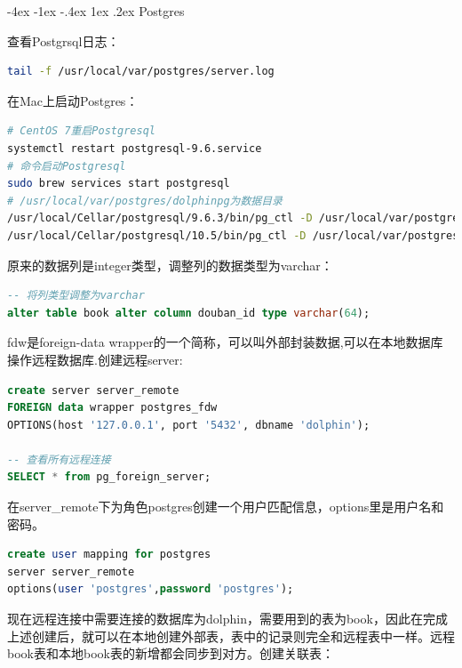 \documentclass[8pt]{book}
\makeatletter
\numberwithin{dummy}{section}
\theoremstyle{ocrenumbox}
\theoremstyle{blacknumex}
\theoremstyle{blacknumbox}
\theoremstyle{ocrenum}
\renewcommand{\section}{\@startsection{section}{1}{\z@}
	{-4ex \@plus -1ex \@minus -.4ex}
	{1ex \@plus.2ex }
	{\normalfont\large\sffamily\bfseries}}
\makeatother
\begin{document}
\section{Postgres}

查看Postgrsql日志：

\begin{lstlisting}[language=Bash]
tail -f /usr/local/var/postgres/server.log
\end{lstlisting}

在Mac上启动Postgres：

\begin{lstlisting}[language=Bash]
# CentOS 7重启Postgresql
systemctl restart postgresql-9.6.service
# 命令启动Postgresql
sudo brew services start postgresql
# /usr/local/var/postgres/dolphinpg为数据目录
/usr/local/Cellar/postgresql/9.6.3/bin/pg_ctl -D /usr/local/var/postgres -l /usr/local/var/postgres/server.log start
/usr/local/Cellar/postgresql/10.5/bin/pg_ctl -D /usr/local/var/postgres/dolphinpg -l /usr/local/var/postgres/server.log start
\end{lstlisting}

原来的数据列是integer类型，调整列的数据类型为varchar：

\begin{lstlisting}[language=SQL]
-- 将列类型调整为varchar
alter table book alter column douban_id type varchar(64);
\end{lstlisting}

fdw是foreign-data wrapper的一个简称，可以叫外部封装数据,可以在本地数据库操作远程数据库.创建远程server:

\begin{lstlisting}[language=SQL]
create server server_remote 
FOREIGN data wrapper postgres_fdw 
OPTIONS(host '127.0.0.1', port '5432', dbname 'dolphin');

-- 查看所有远程连接
SELECT * from pg_foreign_server;
\end{lstlisting}

在server\_remote下为角色postgres创建一个用户匹配信息，options里是用户名和密码。

\begin{lstlisting}[language=SQL]
create user mapping for postgres 
server server_remote 
options(user 'postgres',password 'postgres');
\end{lstlisting}

现在远程连接中需要连接的数据库为dolphin，需要用到的表为book，因此在完成上述创建后，就可以在本地创建外部表，表中的记录则完全和远程表中一样。远程book表和本地book表的新增都会同步到对方。创建关联表：
\end{document}
